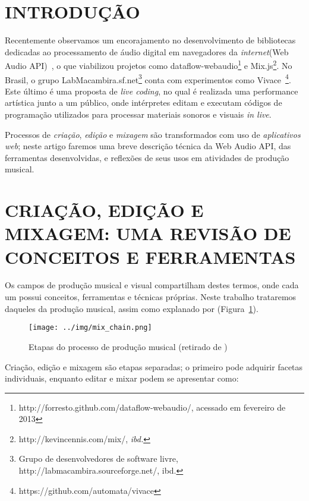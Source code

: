 \documentclass
  [ams,pdfout]%
        {aesbr}
\begin{document}
\section{INTRODUÇÃO}

Recentemente observamos um encorajamento no desenvolvimento de
bibliotecas dedicadas ao processamento de áudio digital em navegadores
da \emph{internet}(Web Audio API)~\cite{webaudio}, o que viabilizou
projetos como
dataflow-webaudio\footnote{http://forresto.github.com/dataflow-webaudio/,
  acessado em fevereiro de 2013} e
Mix.js\footnote{http://kevincennis.com/mix/, \emph{ibd.}}. No Brasil,
o grupo LabMacambira.sf.net\footnote{Grupo de desenvolvedores de
  software livre, http://labmacambira.sourceforge.net/, ibd.} conta
com experimentos como
Vivace~\cite{Vivace,foobarbaz}\footnote{https://github.com/automata/vivace}. Este
último é uma proposta de \emph{live
  coding}\cite{nilson2007live,collins2003live,ward2004live,collins2011live},
no qual é realizada uma performance artística junto a um público, onde
intérpretes editam e executam códigos de programação utilizados para
processar materiais sonoros e visuais \emph{in live}.

Processos de \emph{criação}, \emph{edição} e \emph{mixagem} são
transformados com uso de \emph{aplicativos web}; neste artigo faremos
uma breve descrição técnica da Web Audio API, das ferramentas
desenvolvidas, e reflexões de seus usos em atividades de produção
musical.

\section{CRIAÇÃO, EDIÇÃO E MIXAGEM: UMA REVISÃO DE CONCEITOS E FERRAMENTAS}

Os campos de produção musical e visual compartilham destes termos,
onde cada um possui conceitos, ferramentas e técnicas próprias. Neste
trabalho trataremos daqueles da produção musical, assim como explanado
por \cite{izhaki2008mix} (Figura~\ref{figure:mix_chain}).

\begin{figure}[htpb]
  \begin{center}
    \texttt{[image: ../img/mix\_chain.png]}
    \caption{Etapas do processo de produção musical (retirado de
      \cite{izhaki2008mix})}
    \label{figure:mix_chain}
  \end{center}
\end{figure}

Criação, edição e mixagem são etapas separadas; o primeiro pode
adquirir facetas individuais, enquanto editar e mixar podem se
apresentar como:
\end{document}
